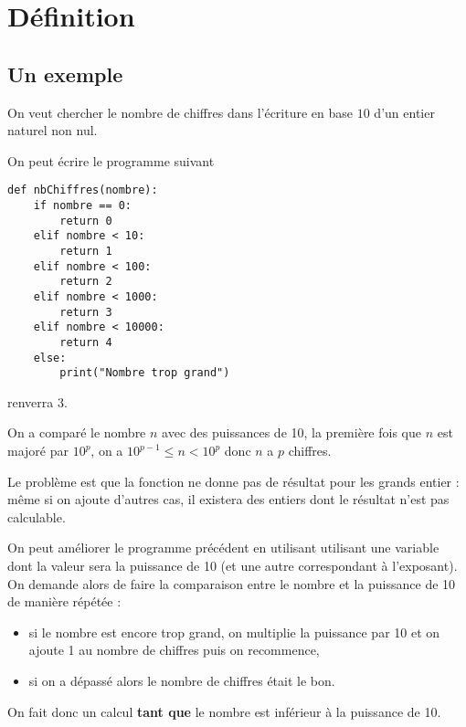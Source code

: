 \section{Définition}
\subsection{Un exemple}
On veut chercher le nombre de chiffres dans l'écriture en base $10$ d'un entier naturel non nul.

On peut écrire le programme suivant
\begin{lstlisting}
def nbChiffres(nombre):
    if nombre == 0: 
        return 0
    elif nombre < 10:
        return 1
    elif nombre < 100:
        return 2
    elif nombre < 1000:
        return 3
    elif nombre < 10000:
        return 4
    else:
        print("Nombre trop grand")
\end{lstlisting}
 renverra 3.

On a comparé le nombre $n$ avec des puissances de 10, la première fois que $n$ est majoré par $10^p$, on a $10^{p-1} \le n
< 10^p$ donc $n$ a $p$ chiffres.

Le problème est que la fonction ne donne pas de résultat pour les grands entier : même si on ajoute d'autres cas, il existera des entiers dont le résultat n'est pas calculable.

On peut améliorer le programme précédent en utilisant utilisant une variable dont la valeur sera la puissance de 10 (et une autre correspondant à l'exposant). On demande alors de faire la comparaison entre le nombre et la puissance de 10 de manière répétée :
\begin{itemize}
  \item si le nombre est encore trop grand, on multiplie la puissance par 10 et on ajoute 1 au nombre de chiffres puis on recommence,
  \item si on a dépassé alors le nombre de chiffres était le bon.
\end{itemize}
On fait donc un calcul {\bf tant que} le nombre est inférieur à la puissance de 10.

